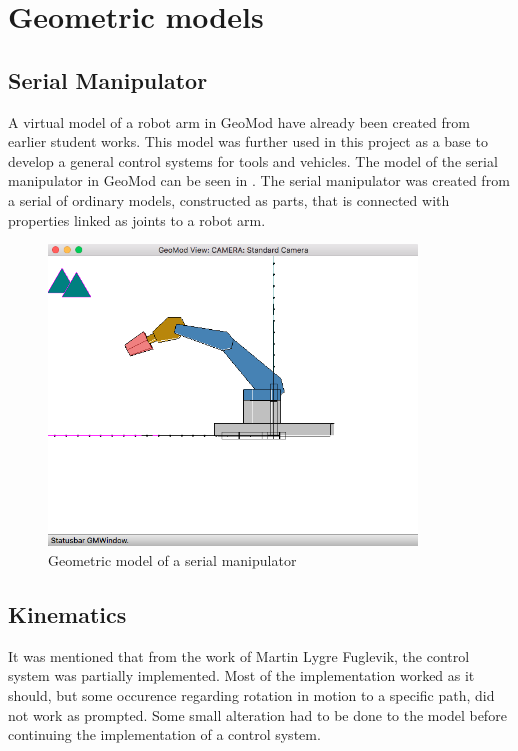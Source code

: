 \chapter{Geometric models}

\section{Serial Manipulator}
A virtual model of a robot arm in GeoMod have already been created from earlier student works. This model was further used in this project as a base to develop a general control systems for tools and vehicles. The model of the serial manipulator in GeoMod can be seen in . The serial manipulator was created from a serial of ordinary models, constructed as parts, that is connected with properties linked as joints to a robot arm.

\begin{figure}[ht]
    \centering
    \includegraphics[height=8cm]{images/GeometricModel.png}
    \caption[Geometric model of a serial manipulator]{Geometric model of a serial manipulator}
    \label{fig:SerialManipulator}
\end{figure}


\section{Kinematics}
It was mentioned that from the work of Martin Lygre Fuglevik, the control system was partially implemented. Most of the implementation worked as it should, but some occurence regarding rotation in motion to a specific path, did not work as prompted. Some small alteration had to be done to the model before continuing the implementation of a control system.

